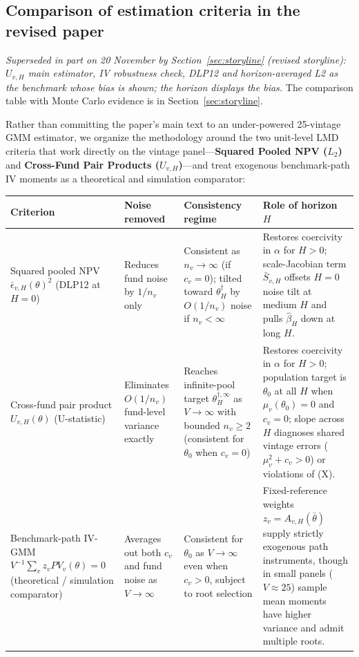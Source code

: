 \documentclass[11pt]{article}
\begin{document}
\subsection{Comparison of estimation criteria in the revised paper}
\emph{Superseded in part on 20 November by Section~\ref{sec:storyline} (revised storyline): $U_{v,H}$ main estimator, IV robustness check, DLP12 and horizon-averaged L2 as the benchmark whose bias is shown; the horizon displays the bias.} The comparison table with Monte Carlo evidence is in Section~\ref{sec:storyline}.


Rather than committing the paper's main text to an under-powered 25-vintage GMM estimator, we organize the methodology around the two unit-level LMD criteria that work directly on the vintage panel—\textbf{Squared Pooled NPV ($L_2$)} and \textbf{Cross-Fund Pair Products ($U_{v,H}$)}—and treat exogenous benchmark-path IV moments as a theoretical and simulation comparator:

{\small
\begin{longtable}{@{}L{3.5cm}L{3.2cm}L{3.2cm}L{5.4cm}@{}}
\toprule
Criterion & Noise removed & Consistency regime & Role of horizon $H$\\
\midrule
\endhead
Squared pooled NPV $\bar\epsilon_{v,H}(\theta)^2$ (DLP12 at $H=0$) & Reduces fund noise by $1/n_v$ only & Consistent as $n_v\to\infty$ (if $c_v=0$); tilted toward $\theta_H^\dagger$ by $O(1/n_v)$ noise if $n_v<\infty$ & Restores coercivity in $\alpha$ for $H>0$; scale-Jacobian term $\bar S_{v,H}$ offsets $H=0$ noise tilt at medium $H$ and pulls $\hat\beta_H$ down at long $H$.\\
Cross-fund pair product $U_{v,H}(\theta)$ (U-statistic) & Eliminates $O(1/n_v)$ fund-level variance exactly & Reaches infinite-pool target $\theta_H^{\dagger,\infty}$ as $V\to\infty$ with bounded $n_v\ge 2$ (consistent for $\theta_0$ when $c_v=0$) & Restores coercivity in $\alpha$ for $H>0$; population target is $\theta_0$ at all $H$ when $\mu_v(\theta_0)=0$ and $c_v=0$; slope across $H$ diagnoses shared vintage errors ($\mu_v^2+c_v>0$) or violations of (X).\\
Benchmark-path IV-GMM $V^{-1}\sum_v z_v PV_v(\theta)=0$ (theoretical / simulation comparator) & Averages out both $c_v$ and fund noise as $V\to\infty$ & Consistent for $\theta_0$ as $V\to\infty$ even when $c_v>0$, subject to root selection & Fixed-reference weights $z_v=A_{v,H}(\bar\theta)$ supply strictly exogenous path instruments, though in small panels ($V\approx 25$) sample mean moments have higher variance and admit multiple roots.\\
\bottomrule
\end{longtable}
}
\end{document}
